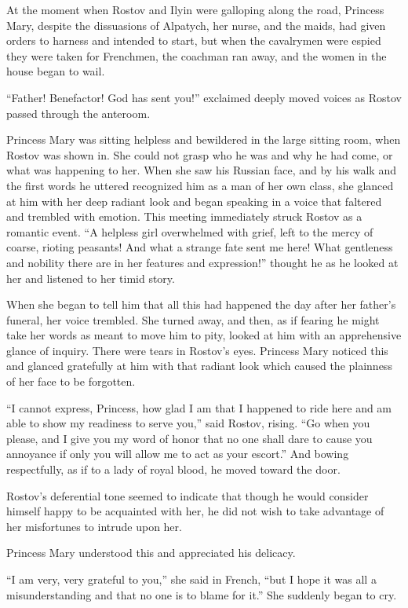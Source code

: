 At the moment when Rostov and Ilyin were galloping along the
road, Princess Mary, despite the dissuasions of Alpatych, her
nurse, and the maids, had given orders to harness and intended to
start, but when the cavalrymen were espied they were taken for
Frenchmen, the coachman ran away, and the women in the house
began to wail.

``Father! Benefactor! God has sent you!'' exclaimed deeply moved
voices as Rostov passed through the anteroom.

Princess Mary was sitting helpless and bewildered in the large
sitting room, when Rostov was shown in. She could not grasp who
he was and why he had come, or what was happening to her. When
she saw his Russian face, and by his walk and the first words he
uttered recognized him as a man of her own class, she glanced at
him with her deep radiant look and began speaking in a voice that
faltered and trembled with emotion. This meeting immediately
struck Rostov as a romantic event. ``A helpless girl overwhelmed
with grief, left to the mercy of coarse, rioting peasants!  And
what a strange fate sent me here! What gentleness and nobility
there are in her features and expression!'' thought he as he
looked at her and listened to her timid story.

When she began to tell him that all this had happened the day
after her father's funeral, her voice trembled. She turned away,
and then, as if fearing he might take her words as meant to move
him to pity, looked at him with an apprehensive glance of
inquiry. There were tears in Rostov's eyes. Princess Mary noticed
this and glanced gratefully at him with that radiant look which
caused the plainness of her face to be forgotten.

``I cannot express, Princess, how glad I am that I happened to
ride here and am able to show my readiness to serve you,'' said
Rostov, rising. ``Go when you please, and I give you my word of
honor that no one shall dare to cause you annoyance if only you
will allow me to act as your escort.''  And bowing respectfully,
as if to a lady of royal blood, he moved toward the door.

Rostov's deferential tone seemed to indicate that though he would
consider himself happy to be acquainted with her, he did not wish
to take advantage of her misfortunes to intrude upon her.

Princess Mary understood this and appreciated his delicacy.

``I am very, very grateful to you,'' she said in French, ``but I
hope it was all a misunderstanding and that no one is to blame
for it.'' She suddenly began to cry.

